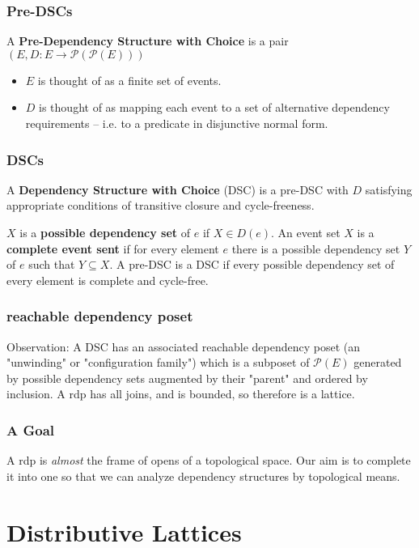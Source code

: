 \documentclass{beamer}
\newcommand{\Pc}{\mathcal{P}}
\begin{document}
\begin{frame}
\frametitle{Pre-DSCs}
\begin{definition}
A \textbf{Pre-Dependency Structure with Choice} is a pair \((E, D : E \rightarrow \Pc(\Pc(E)))\) \end{definition}
\begin{itemize}
\item \(E\) is thought of as a finite set of events.
\item \(D\) is thought of as mapping each event to a set of alternative dependency requirements -- i.e. to a predicate in disjunctive normal form.
\end{itemize}
\end{frame}


\begin{frame}
\frametitle{DSCs}
\begin{definition}
A \textbf{Dependency Structure with Choice} (DSC) is a pre-DSC with \(D\) satisfying appropriate conditions of transitive closure and cycle-freeness. 
\end{definition}
\(X\) is a \textbf{possible dependency set} of \(e\) if \(X \in D(e)\). An event set \(X\) is a \textbf{complete event sent} if for every element \(e\) there is a possible dependency set \(Y\) of \(e\) such that \(Y \subseteq X\). A pre-DSC is a DSC if every possible dependency set of every element is complete and cycle-free.
\end{frame}	

\begin{frame}
\frametitle{reachable dependency poset}
Observation: A DSC has an associated reachable dependency poset (an "unwinding" or "configuration family") which is a subposet of \(\Pc(E)\) generated by possible dependency sets augmented by their "parent" and ordered by inclusion. A rdp has all joins, and is bounded, so therefore is a lattice. 

\end{frame}

\begin{frame}
\frametitle{A Goal}
A rdp is \textit{almost} the frame of opens of a topological space. Our aim is to complete it into one so that we can analyze dependency structures by topological means.
\end{frame}

\section{Distributive Lattices}
\end{document}
